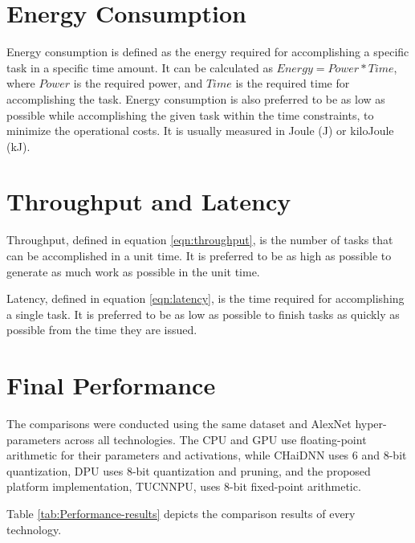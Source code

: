 \section{Energy Consumption}
Energy consumption is defined as the energy required for accomplishing a specific task in a specific time amount. It can be calculated as $Energy = Power * Time$, where $Power$ is the required power, and $Time$ is the required time for accomplishing the task. Energy consumption is also preferred to be as low as possible while accomplishing the given task within the time constraints, to minimize the operational costs. It is usually measured in Joule (J) or kiloJoule (kJ).

\section{Throughput and Latency}
Throughput, defined in equation \ref{eqn:throughput}, is the number of tasks that can be accomplished in a unit time. It is preferred to be as high as possible to generate as much work as possible in the unit time.

Latency, defined in equation \ref{eqn:latency}, is the time required for accomplishing a single task. It is preferred to be as low as possible to finish tasks as quickly as possible from the time they are issued.

\section{Final Performance}
The comparisons were conducted using the same dataset and AlexNet hyper-parameters across all technologies. The CPU and GPU use floating-point arithmetic for their parameters and activations, while CHaiDNN uses 6 and 8-bit quantization, DPU uses 8-bit quantization and pruning, and the proposed platform implementation, TUCNNPU, uses 8-bit fixed-point arithmetic.

Table \ref{tab:Performance-results} depicts the comparison results of every technology.

